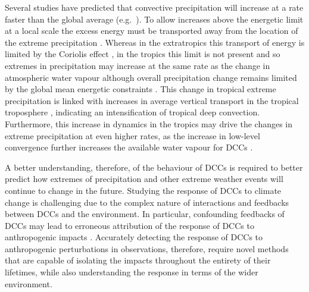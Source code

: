 Several studies have predicted that convective precipitation will increase at a rate faster than the global average (e.g.\ \citet{ogorman_physical_2009, muller_intensification_2011, ogorman_precipitation_2015, donat_more_2016}).
To allow increases above the energetic limit at a local scale the excess energy must be transported away from the location of the extreme precipitation \citep{muller_energetic_2011}.
Whereas in the extratropics this transport of energy is limited by the Coriolis effect \citep{ogorman_physical_2009}, in the tropics this limit is not present and so extremes in precipitation may increase at the same rate as the change in atmospheric water vapour \citep{ogorman_energetic_2012} although overall precipitation change remains limited by the global mean energetic constraints \citep{allen_constraints_2002}.
This change in tropical extreme precipitation is linked with increases in average vertical transport in the tropical troposphere \citep{muller_energetic_2011}, indicating an intensification of tropical deep convection.
Furthermore, this increase in dynamics in the tropics may drive the changes in extreme precipitation at even higher rates, as the increase in low-level convergence further increases the available water vapour for DCCs \citep{ogorman_energetic_2012}.

A better understanding, therefore, of the behaviour of DCCs is required to better predict how extremes of precipitation and other extreme weather events will continue to change in the future.
Studying the response of DCCs to climate change is challenging due to the complex nature of interactions and feedbacks between DCCs and the environment.
In particular, confounding feedbacks of DCCs may lead to erroneous attribution of the response of DCCs to anthropogenic impacts \citep{varble_erroneous_2018}.
Accurately detecting the response of DCCs to anthropogenic perturbations in observations, therefore, require novel methods that are capable of isolating the impacts throughout the entirety of their lifetimes, while also understanding the response in terms of the wider environment.


